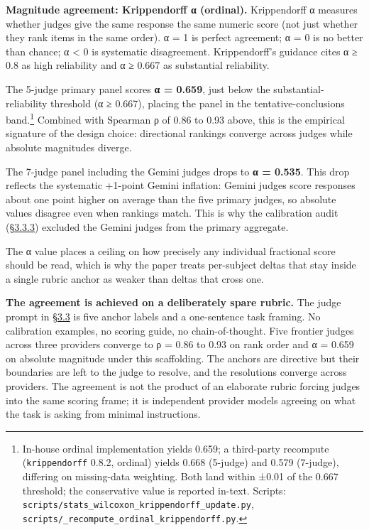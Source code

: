 \textbf{Magnitude agreement: Krippendorff α (ordinal).} Krippendorff α
measures whether judges give the same response the same numeric score
(not just whether they rank items in the same order). α = 1 is perfect
agreement; α = 0 is no better than chance; α \textless{} 0 is systematic
disagreement. Krippendorff's guidance cites α ≥ 0.8 as high reliability
and α ≥ 0.667 as substantial reliability.

The 5-judge primary panel scores \textbf{α = 0.659}, just below the
substantial-reliability threshold (α ≥ 0.667), placing the panel in the
tentative-conclusions band.\footnote{In-house ordinal implementation
  yields 0.659; a third-party recompute (\texttt{krippendorff} 0.8.2,
  ordinal) yields 0.668 (5-judge) and 0.579 (7-judge), differing on
  missing-data weighting. Both land within ±0.01 of the 0.667 threshold;
  the conservative value is reported in-text. Scripts:
  \texttt{scripts/stats\_wilcoxon\_krippendorff\_update.py},
  \texttt{scripts/\_recompute\_ordinal\_krippendorff.py}.}
Combined with Spearman ρ of 0.86 to 0.93 above, this is the empirical
signature of the design choice: directional rankings converge across
judges while absolute magnitudes diverge.

The 7-judge panel including the Gemini judges drops to \textbf{α =
0.535}. This drop reflects the systematic +1-point Gemini inflation:
Gemini judges score responses about one point higher on average than the
five primary judges, so absolute values disagree even when rankings
match. This is why the calibration audit (\hyperref[calibration]{§3.3.3}) excluded the Gemini
judges from the primary aggregate.

The α value places a ceiling on how precisely any individual fractional
score should be read, which is why the paper treats per-subject deltas
that stay inside a single rubric anchor as weaker than deltas that cross
one.

\textbf{The agreement is achieved on a deliberately spare rubric.} The
judge prompt in \hyperref[scoring-rubric-with-calibrated-llm-judge-panel]{§3.3} is five anchor labels and a one-sentence task
framing. No calibration examples, no scoring guide, no chain-of-thought.
Five frontier judges across three providers converge to ρ = 0.86 to 0.93
on rank order and α = 0.659 on absolute magnitude under this
scaffolding. The anchors are directive but their boundaries are left to
the judge to resolve, and the resolutions converge across providers. The
agreement is not the product of an elaborate rubric forcing judges into
the same scoring frame; it is independent provider models agreeing on
what the task is asking from minimal instructions.

